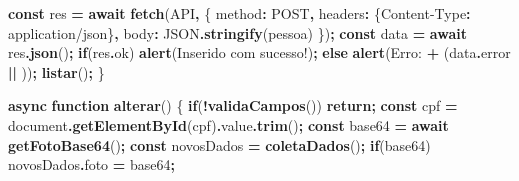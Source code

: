 \documentclass[
]{book}
\newenvironment{Shaded}{\begin{snugshade}}{\end{snugshade}}
\newcommand{\AttributeTok}[1]{\textcolor[rgb]{0.13,0.29,0.53}{#1}}
\newcommand{\BuiltInTok}[1]{#1}
\newcommand{\ControlFlowTok}[1]{\textcolor[rgb]{0.13,0.29,0.53}{\textbf{#1}}}
\newcommand{\DataTypeTok}[1]{\textcolor[rgb]{0.13,0.29,0.53}{#1}}
\newcommand{\FunctionTok}[1]{\textcolor[rgb]{0.13,0.29,0.53}{\textbf{#1}}}
\newcommand{\KeywordTok}[1]{\textcolor[rgb]{0.13,0.29,0.53}{\textbf{#1}}}
\newcommand{\NormalTok}[1]{#1}
\newcommand{\OperatorTok}[1]{\textcolor[rgb]{0.81,0.36,0.00}{\textbf{#1}}}
\newcommand{\StringTok}[1]{\textcolor[rgb]{0.31,0.60,0.02}{#1}}
\begin{document}
\begin{Shaded}
\begin{Highlighting}[]
  \KeywordTok{const}\NormalTok{ res }\OperatorTok{=} \ControlFlowTok{await} \FunctionTok{fetch}\NormalTok{(API}\OperatorTok{,}\NormalTok{ \{}
    \DataTypeTok{method}\OperatorTok{:} \StringTok{\textquotesingle{}POST\textquotesingle{}}\OperatorTok{,}
    \DataTypeTok{headers}\OperatorTok{:}\NormalTok{ \{}\StringTok{\textquotesingle{}Content{-}Type\textquotesingle{}}\OperatorTok{:} \StringTok{\textquotesingle{}application/json\textquotesingle{}}\NormalTok{\}}\OperatorTok{,}
    \DataTypeTok{body}\OperatorTok{:} \BuiltInTok{JSON}\OperatorTok{.}\FunctionTok{stringify}\NormalTok{(pessoa)}
\NormalTok{  \})}\OperatorTok{;}
  \KeywordTok{const}\NormalTok{ data }\OperatorTok{=} \ControlFlowTok{await}\NormalTok{ res}\OperatorTok{.}\FunctionTok{json}\NormalTok{()}\OperatorTok{;}
  \ControlFlowTok{if}\NormalTok{(res}\OperatorTok{.}\AttributeTok{ok}\NormalTok{) }\FunctionTok{alert}\NormalTok{(}\StringTok{\textquotesingle{}Inserido com sucesso!\textquotesingle{}}\NormalTok{)}\OperatorTok{;}
  \ControlFlowTok{else} \FunctionTok{alert}\NormalTok{(}\StringTok{\textquotesingle{}Erro: \textquotesingle{}} \OperatorTok{+}\NormalTok{ (data}\OperatorTok{.}\AttributeTok{error} \OperatorTok{||} \StringTok{\textquotesingle{}\textquotesingle{}}\NormalTok{))}\OperatorTok{;}
  \FunctionTok{listar}\NormalTok{()}\OperatorTok{;}
\NormalTok{\}}

\KeywordTok{async} \KeywordTok{function} \FunctionTok{alterar}\NormalTok{() \{}
  \ControlFlowTok{if}\NormalTok{(}\OperatorTok{!}\FunctionTok{validaCampos}\NormalTok{()) }\ControlFlowTok{return}\OperatorTok{;}
  \KeywordTok{const}\NormalTok{ cpf }\OperatorTok{=} \BuiltInTok{document}\OperatorTok{.}\FunctionTok{getElementById}\NormalTok{(}\StringTok{\textquotesingle{}cpf\textquotesingle{}}\NormalTok{)}\OperatorTok{.}\AttributeTok{value}\OperatorTok{.}\FunctionTok{trim}\NormalTok{()}\OperatorTok{;}
  \KeywordTok{const}\NormalTok{ base64 }\OperatorTok{=} \ControlFlowTok{await} \FunctionTok{getFotoBase64}\NormalTok{()}\OperatorTok{;}
  \KeywordTok{const}\NormalTok{ novosDados }\OperatorTok{=} \FunctionTok{coletaDados}\NormalTok{()}\OperatorTok{;}
  \ControlFlowTok{if}\NormalTok{(base64) novosDados}\OperatorTok{.}\AttributeTok{foto} \OperatorTok{=}\NormalTok{ base64}\OperatorTok{;}


\end{Highlighting}
\end{Shaded}
\end{document}
